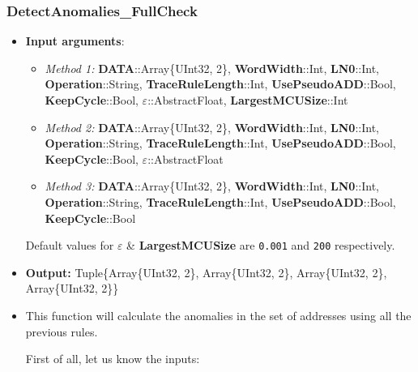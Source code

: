  \subsubsection*{DetectAnomalies\_FullCheck}\label{Fun:DetectAnomaliesFullCheck}
 \begin{itemize}
 	\item \textbf{Input arguments}:
 	\begin{itemize}
 		\item  \textit{Method 1: }\textbf{DATA}::Array\{UInt32, 2\}, 
 		\textbf{WordWidth}::Int,
 		\textbf{LN0}::Int, \\
 		\textbf{Operation}::String,
 		\textbf{TraceRuleLength}::Int,
 		\textbf{UsePseudoADD}::Bool,\\
 		\textbf{KeepCycle}::Bool,
 		\textbf{\(\varepsilon\)}::AbstractFloat,
 		\textbf{LargestMCUSize}::Int
 		\item  \textit{Method 2: }\textbf{DATA}::Array\{UInt32, 2\}, 
 		\textbf{WordWidth}::Int,
 		\textbf{LN0}::Int, \\
 		\textbf{Operation}::String,
 		\textbf{TraceRuleLength}::Int,
 		\textbf{UsePseudoADD}::Bool, \\
 		\textbf{KeepCycle}::Bool,
 		\textbf{\(\varepsilon\)}::AbstractFloat
 		\item  \textit{Method 3: }\textbf{DATA}::Array\{UInt32, 2\}, 
 		\textbf{WordWidth}::Int,
 		\textbf{LN0}::Int, \\
 		\textbf{Operation}::String,
 		\textbf{TraceRuleLength}::Int,
 		\textbf{UsePseudoADD}::Bool,\\
 		\textbf{KeepCycle}::Bool
 	\end{itemize}
 	
 	Default values for \textbf{\(\varepsilon\)} \& 	\textbf{LargestMCUSize} are \texttt{0.001} and \texttt{200} respectively.
 	\item \textbf{Output: } Tuple\{Array\{UInt32, 2\}, Array\{UInt32, 2\}, Array\{UInt32, 2\}, Array\{UInt32, 2\}\}	
 	\item This function will calculate the anomalies in the set of addresses using all the previous rules.
 	 
 	First of all, let us know the inputs:
 	\begin{itemize}
 		

\end{itemize}
\end{itemize}
